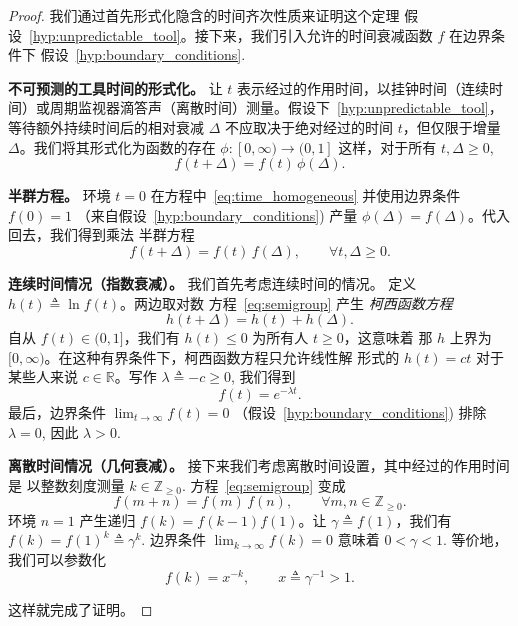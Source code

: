 \begin{proof}
我们通过首先形式化隐含的时间齐次性质来证明这个定理
假设~\ref{hyp:unpredictable_tool}。接下来，我们引入允许的时间衰减函数 $f$ 在边界条件下
假设~\ref{hyp:boundary_conditions}.
\smallskip

\noindent\textbf{不可预测的工具时间的形式化。} 让 $t$ 表示经过的作用时间，以挂钟时间（连续时间）或周期监视器滴答声（离散时间）测量。假设下~\ref{hyp:unpredictable_tool}，等待额外持续时间后的相对衰减 $\Delta$ 不应取决于绝对经过的时间 $t$，但仅限于增量 $\Delta$。我们将其形式化为函数的存在 $\phi:[0,\infty)\to(0,1]$ 这样，对于所有 $t,\Delta\ge 0$, \begin{equation} f(t+\Delta)=f(t)\,\phi(\Delta). \label{eq:time_homogeneous} \end{equation}

\noindent\textbf{半群方程。} 环境 $t=0$ 在方程中~\ref{eq:time_homogeneous} 并使用边界条件 $f(0)=1$
（来自假设~\ref{hyp:boundary_conditions}) 产量
$\phi(\Delta)=f(\Delta)$。代入回去，我们得到乘法
半群方程
\begin{equation}
f(t+\Delta)=f(t)\,f(\Delta),\qquad \forall t,\Delta\ge 0.
\label{eq:semigroup}
\end{equation}

\noindent \textbf{连续时间情况（指数衰减）。} 我们首先考虑连续时间的情况。
定义 $h(t)\triangleq \ln f(t)$。两边取对数
方程~\ref{eq:semigroup} 产生 \emph{柯西函数方程}
\begin{equation}
h(t+\Delta)=h(t)+h(\Delta).
\label{eq:cauchy}
\end{equation}
自从 $f(t)\in(0,1]$，我们有 $h(t)\le 0$ 为所有人 $t\ge 0$，这意味着
那 $h$ 上界为 $[0,\infty)$。在这种有界条件下，柯西函数方程只允许线性解
形式的 $h(t)=ct$ 对于某些人来说 $c\in\mathbb{R}$。写作 $\lambda\triangleq -c\ge 0$,
我们得到
\begin{equation}
f(t)=e^{-\lambda t}.
\label{eq:exp_decay}
\end{equation}
最后，边界条件 $\lim_{t\to\infty} f(t)=0$
（假设~\ref{hyp:boundary_conditions}) 排除 $\lambda=0$,
因此 $\lambda>0$.

\smallskip
\noindent \textbf{离散时间情况（几何衰减）。} 接下来我们考虑离散时间设置，其中经过的作用时间是
以整数刻度测量 $k\in\mathbb{Z}_{\ge 0}$.
方程~\ref{eq:semigroup} 变成
\begin{equation}
f(m+n)=f(m)\,f(n),\qquad \forall m,n\in\mathbb{Z}_{\ge 0}.
\label{eq:semigroup_discrete}
\end{equation}
环境 $n=1$ 产生递归 $f(k)=f(k-1)f(1)$。让 $\gamma \triangleq f(1)$，我们有
$f(k)=f(1)^k\triangleq \gamma^k$.
边界条件 $\lim_{k\to\infty} f(k)=0$ 意味着 $0<\gamma<1$.
等价地，我们可以参数化
\begin{equation}
f(k)=x^{-k},\qquad x\triangleq \gamma^{-1}>1.
\label{eq:geom_decay}
\end{equation}

\noindent 这样就完成了证明。
\end{proof}

